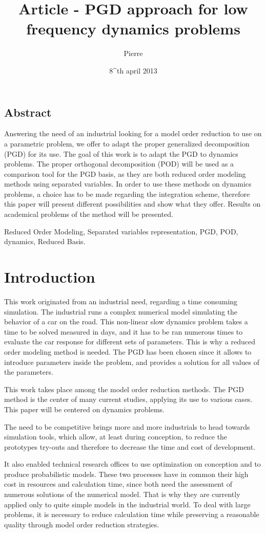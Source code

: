 \documentclass[12pt,a4paper]{article}
\title{Article - PGD approach for low frequency dynamics problems}
\author{Pierre \bsc{Nargil}}
\date{8^{th} april 2013}
\begin{document}
\noindent \vspace*{70.0mm}
\subsection*{Abstract}
Answering the need of an industrial looking for a model order reduction to use on a parametric problem, we offer to adapt the proper generalized decomposition (PGD) for its use. The goal of this work is to adapt the PGD to dynamics problems. The proper orthogonal decomposition (POD) will be used as a comparison tool for the PGD basis, as they are both reduced order modeling methods using separated variables. In order to use these methods on dynamics problems, a choice has to be made regarding the integration scheme, therefore this paper will present different possibilities and show what they offer. Results on academical problems of the method will be presented.
 
\vspace{0.2in}
 Reduced Order Modeling, Separated variables representation, PGD, POD, dynamics, Reduced Basis.


\section{Introduction}


This work originated from an industrial need, regarding a time consuming simulation. The industrial runs a complex numerical model simulating the behavior of a car on the road. This non-linear slow dynamics problem takes a time to be solved measured in days, and it has to be ran numerous times to evaluate the car response for different sets of parameters. This is why a reduced order modeling method is needed. The PGD has been chosen since it allows to introduce parameters inside the problem, and provides a solution for all values of the parameters.

This work takes place among the model order reduction methods. The PGD method is the center of many current studies, applying its use to various cases. This paper will be centered on dynamics problems.

The need to be competitive brings more and more industrials to head towards simulation tools, which allow, at least during conception, to reduce the prototypes try-outs and therefore to decrease the time and cost of development.

It also enabled technical research offices to use optimization on conception and to produce probabilistic models. These two processes have in common their high cost in resources and calculation time, since both need the assessment of numerous solutions of the numerical model. That is why they are currently applied only to quite simple models in the industrial world. To deal with large problems, it is necessary to reduce calculation time while preserving a reasonable quality through model order reduction strategies.
\end{document}
